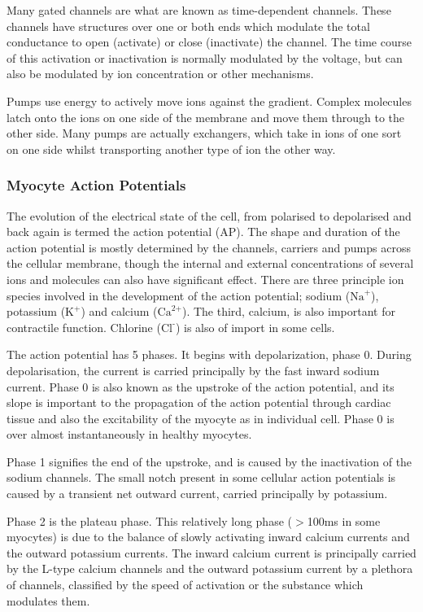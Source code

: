 Many gated channels are what are known as time-dependent channels.
These channels have structures over one or both ends which modulate the total
conductance to open (activate) or close (inactivate) the channel.
The time course of this activation or inactivation is normally modulated by the
voltage, but can also be modulated by ion concentration or other mechanisms.

Pumps use energy to actively move ions against the gradient.
Complex molecules latch onto the ions on one side of the membrane and move them
through to the other side.
Many pumps are actually exchangers, which take in ions of one sort on one side
whilst transporting another type of ion the other way.

\subsubsection{Myocyte Action Potentials}

The evolution of the electrical state of the cell, from polarised to depolarised
and back again is termed the action potential (AP).
The shape and duration of
the action potential is mostly determined by the channels, carriers and pumps
across the cellular membrane, though the internal and external concentrations of
several ions and molecules can also have significant effect.
There are three
principle ion species involved in the development of the action potential;
sodium ($\text{Na}^{\text{+}}$), potassium ($\text{K}^{\text{+}}$) and calcium
($\text{Ca}^{\text{2+}}$).
The third, calcium, is also important for contractile function.
Chlorine ($\text{Cl}^{\text{-}}$) is also of import in some cells.

The action potential has 5 phases.
It begins with depolarization, phase 0.
During depolarisation, the current is carried principally by the fast inward
sodium current.
Phase 0 is also known as the upstroke of the action potential, and its slope is
important to the propagation of the action potential through cardiac tissue and
also the excitability of the myocyte as in individual cell.
Phase 0 is over almost instantaneously in healthy myocytes.

Phase 1 signifies the end of the upstroke, and is caused by the inactivation of
the sodium channels.
The small notch present in some cellular action potentials is caused by a
transient net outward current, carried principally by potassium.

Phase 2 is the plateau phase.  This relatively long phase ($>$100ms in some
myocytes) is due to the balance of slowly activating inward calcium currents and
the outward potassium currents.
The inward calcium current is principally carried by the L-type calcium channels
and the outward potassium current by a plethora of channels, classified by the
speed of activation or the substance which modulates them.

